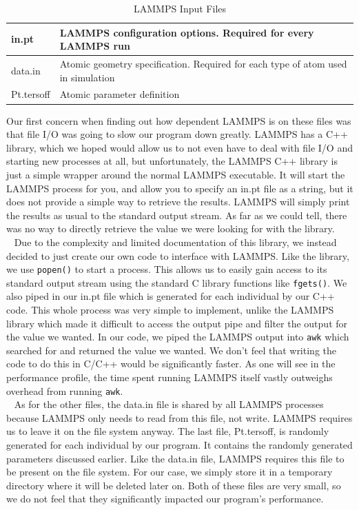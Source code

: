 \documentclass[letterpaper, 12pt]{article}
\begin{document}
\begin{flushleft}
\begin{table}[ht]
	\centering
	\caption{LAMMPS Input Files}
	\label{lammpsinput}
	\begin{tabular}{|l|l|}
		\hline
		in.pt & LAMMPS configuration options. Required for every LAMMPS run \\ \hline
		data.in & Atomic geometry specification. Required for each type of atom used in simulation \\ \hline
		Pt.tersoff & Atomic parameter definition \\ \hline
	\end{tabular}
\end{table}

Our first concern when finding out how dependent LAMMPS is on these files was that file I/O was going to slow our program down greatly. LAMMPS has a C++ library, which we hoped would allow us to not even have to deal with file I/O and starting new processes at all, but unfortunately, the LAMMPS C++ library is just a simple wrapper around the normal LAMMPS executable. It will start the LAMMPS process for you, and allow you to specify an in.pt file as a string, but it does not provide a simple way to retrieve the results. LAMMPS will simply print the results as usual to the standard output stream. As far as we could tell, there was no way to directly retrieve the value we were looking for with the library.\\
~\newline
Due to the complexity and limited documentation of this library, we instead decided to just create our own code to interface with LAMMPS. Like the library, we use \texttt{popen()} to start a process. This allows us to easily gain access to its standard output stream using the standard C library functions like \texttt{fgets()}. We also piped in our in.pt file which is generated for each individual by our C++ code. This whole process was very simple to implement, unlike the LAMMPS library which made it difficult to access the output pipe and filter the output for the value we wanted. In our code, we piped the LAMMPS output into \texttt{awk} which searched for and returned the value we wanted. We don't feel that writing the code to do this in C/C++ would be significantly faster. As one will see in the performance profile, the time spent running LAMMPS itself vastly outweighs overhead from running \texttt{awk}.  \\
~\newline
As for the other files, the data.in file is shared by all LAMMPS processes because LAMMPS only needs to read from this file, not write. LAMMPS requires us to leave it on the file system anyway. The last file, Pt.tersoff, is randomly generated for each individual by our program. It contains the randomly generated parameters discussed earlier. Like the data.in file, LAMMPS requires this file to be present on the file system. For our case, we simply store it in a temporary directory where it will be deleted later on. Both of these files are very small, so we do not feel that they significantly impacted our program's performance. \\
~\newline

\end{flushleft}
\end{document}
